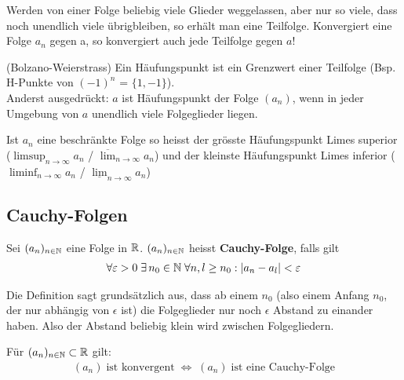 \begin{definition}[Teilfolge] 
Werden von einer Folge beliebig viele Glieder weggelassen, aber nur so viele,
dass noch unendlich viele übrigbleiben, so erhält man eine Teilfolge.
Konvergiert eine Folge $a_n$ gegen a, so konvergiert auch jede Teilfolge gegen $a$!
\end{definition}

\begin{definition}[Häufungspunkt]  (Bolzano-Weierstrass)
	Ein Häufungspunkt ist ein Grenzwert einer Teilfolge (Bsp. H-Punkte von $(-1)^n$ = $\{1, -1\}$). \\
	Anderst ausgedrückt: 
	$a$ ist Häufungspunkt der Folge $(a_n)$, wenn in jeder Umgebung von $a$
	unendlich viele Folgeglieder liegen.
\end{definition}

\begin{definition} \index{$\limsup$}\index{$\liminf$}
	Ist $a_n$ eine beschränkte Folge so heisst der grösste Häufungspunkt Limes
	superior ($\limsup_{n \to \infty} a_n$ / $\overline{\lim}_{n \to \infty}
	a_n$) und der kleinste Häufungspunkt Limes inferior ($\liminf_{n \to
	\infty} a_n$ / $\underline{\lim}_{n \to \infty} a_n$)
\end{definition}

\subsection{Cauchy-Folgen}
\begin{definition}
Sei $(a_n)_{n \in \mathbb{N}}$ eine Folge in $\mathbb{R}$. $(a_n)_{n \in \mathbb{N}}$ heisst \textbf{Cauchy-Folge}, falls gilt
\begin{align*}
\forall \varepsilon > 0 \; \exists \, n_0 \in \mathbb{N} \; \forall n, l \geq n_0: |a_n - a_l| < \varepsilon
\end{align*}
\end{definition}

Die Definition sagt grundsätzlich aus, dass ab einem $n_0$ (also einem Anfang $n_0$, der nur abhängig von $\epsilon$ ist)
die Folgeglieder nur noch $\epsilon$ Abstand zu einander haben. Also der Abstand beliebig klein wird zwischen Folgegliedern.

\begin{satz}
Für $(a_n)_{n \in \mathbb{N}} \subset \mathbb{R}$ gilt:
\begin{align*}
	(a_n) \; \text{ist konvergent} \; \Leftrightarrow \; (a_n) \; \text{ist eine Cauchy-Folge}
\end{align*}
\end{satz}


